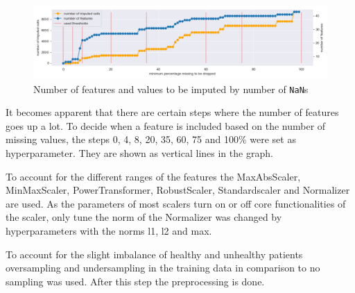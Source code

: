 \begin{figure}[h]
	\centering
	\includegraphics[width=\textwidth]{images/percentageToBeDropped.png}
	\caption{Number of features and values to be imputed by number of \texttt{NaN}s}
	\label{fig:percentageToBeDropped}
\end{figure}

It becomes apparent that there are certain steps where the number of features goes up a lot. To decide when a feature is included based on the number of missing values, the steps 0, 4, 8, 20, 35, 60, 75 and 100\% were set as hyperparameter. They are shown as vertical lines in the graph. 

To account for the different ranges of the features the MaxAbsScaler, MinMaxScaler, PowerTransformer, RobustScaler, Standardscaler and Normalizer are used. As the parameters of most scalers turn on or off core functionalities of the scaler, only tune the norm of the Normalizer was changed by hyperparameters with the norms l1, l2 and max.

To account for the slight imbalance of healthy and unhealthy patients oversampling and undersampling in the training data in comparison to no sampling was used. After this step the preprocessing is done. 


